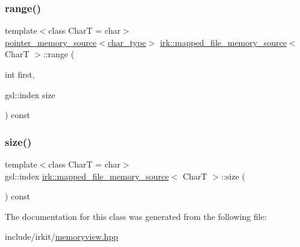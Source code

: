 \mbox{\label{classirk_1_1mapped__file__memory__source_a4f437093075267ae96a512877b8c4b11}} 
\subsubsection{\texorpdfstring{range()}{range()}}
{\footnotesize\ttfamily template$<$class CharT  = char$>$ \\
\mbox{\hyperlink{classirk_1_1pointer__memory__source}{pointer\+\_\+memory\+\_\+source}}$<$\mbox{\hyperlink{classirk_1_1mapped__file__memory__source_a9b4319787fae825c6a27be1e58447386}{char\+\_\+type}}$>$ \mbox{\hyperlink{classirk_1_1mapped__file__memory__source}{irk\+::mapped\+\_\+file\+\_\+memory\+\_\+source}}$<$ CharT $>$\+::range (\begin{DoxyParamCaption}\item[{int}]{first,  }\item[{gsl\+::index}]{size }\end{DoxyParamCaption}) const\hspace{0.3cm}{\ttfamily [inline]}}

\mbox{\label{classirk_1_1mapped__file__memory__source_a8b873edb44d37ff8fc89c80ff9c88482}} 
\subsubsection{\texorpdfstring{size()}{size()}}
{\footnotesize\ttfamily template$<$class CharT  = char$>$ \\
gsl\+::index \mbox{\hyperlink{classirk_1_1mapped__file__memory__source}{irk\+::mapped\+\_\+file\+\_\+memory\+\_\+source}}$<$ CharT $>$\+::size (\begin{DoxyParamCaption}{ }\end{DoxyParamCaption}) const\hspace{0.3cm}{\ttfamily [inline]}}



The documentation for this class was generated from the following file\+:\begin{DoxyCompactItemize}
\item 
include/irkit/\mbox{\hyperlink{memoryview_8hpp}{memoryview.\+hpp}}\end{DoxyCompactItemize}
